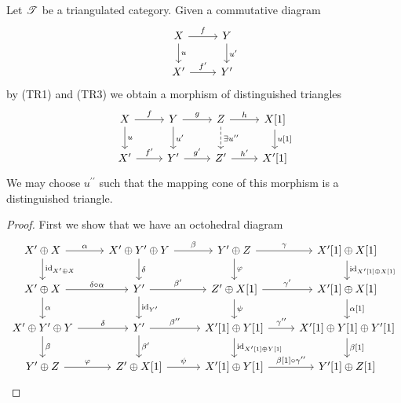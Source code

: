 \documentclass[dissertation.tex]{subfiles}
\begin{document}
\begin{prop}\label{tr3cones}
  Let $\mathscr{T}$ be a triangulated category.
  Given a commutative diagram
  $$\begin{tikzcd}
    X \arrow{r}{f}\arrow{d}{u} & Y\arrow{d}{u^\prime}\\
    X^\prime \arrow{r}{f^\prime} & Y^\prime
  \end{tikzcd}$$
  by (TR1) and (TR3) we obtain a morphism of distinguished triangles
  $$\begin{tikzcd}
      X \arrow{r}{f}\arrow{d}{u} & Y\arrow{d}{u^\prime}\arrow{r}{g} & Z \arrow{r}{h}\arrow[dashed]{d}{\exists u^{\prime\prime}} & X[1]\arrow{d}{u[1]}\\
    X^\prime \arrow{r}{f^\prime} & Y^\prime \arrow{r}{g^\prime} & Z^\prime \arrow{r}{h^\prime} & X^\prime[1]
  \end{tikzcd}$$
  We may choose $u^{\prime\prime}$ such that the mapping cone of this morphism is a distinguished triangle.

\begin{proof}
  First we show that we have an octohedral diagram
  $$\begin{tikzcd}
    X^\prime \oplus X \arrow{r}{\alpha}\arrow{d}{\id_{X^\prime \oplus X}} & X^\prime \oplus Y^\prime \oplus Y \arrow{r}{\beta}\arrow{d}{\delta} & Y^\prime \oplus Z \arrow{r}{\gamma}\arrow{d}{\varphi} & X^\prime[1] \oplus X[1]\arrow{d}{\id_{X^\prime[1] \oplus X[1]}}\\
    X^\prime \oplus X \arrow{r}{\delta \circ \alpha}\arrow{d}{\alpha} & Y^\prime \arrow{r}{\beta^\prime}\arrow{d}{\id_{Y^\prime}} & Z^\prime \oplus X[1] \arrow{r}{\gamma^\prime}\arrow{d}{\psi} & X^\prime[1] \oplus X[1]\arrow{d}{\alpha[1]}\\
    X^\prime \oplus Y^\prime \oplus Y \arrow{r}{\delta}\arrow{d}{\beta} & Y^\prime \arrow{r}{\beta^{\prime\prime}}\arrow{d}{\beta^\prime} & X^\prime[1] \oplus Y[1] \arrow{r}{\gamma^{\prime\prime}}\arrow{d}{\id_{X^\prime[1] \oplus Y[1]}} & X^\prime[1] \oplus Y[1] \oplus Y^\prime[1]\arrow{d}{\beta[1]}\\
    Y^\prime \oplus Z \arrow{r}{\varphi} & Z^\prime \oplus X[1] \arrow{r}{\psi} & X^\prime[1] \oplus Y[1] \arrow{r}{\beta[1] \circ \gamma^{\prime\prime}} & Y^\prime[1] \oplus Z[1]
  \end{tikzcd}$$
  

\end{proof}
\end{prop}
\end{document}
